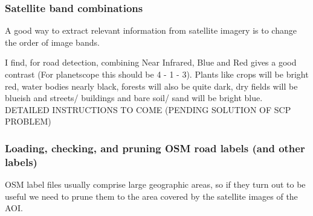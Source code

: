 \documentclass[12pt,a4paper]{scrartcl}
\begin{document}
\subsubsection{Satellite band combinations}
A good way to extract relevant information from satellite imagery is to change the order of image bands.

I find, for road detection, combining Near Infrared, Blue and Red gives a good contrast (For planetscope this should be 4 - 1 - 3).
Plants like crops will be bright red, water bodies nearly black, forests will also be quite dark, dry fields will be blueish and streets/ buildings and bare soil/ sand will be bright blue.\\

DETAILED INSTRUCTIONS TO COME (PENDING SOLUTION OF SCP PROBLEM)

\subsubsection{Loading, checking, and pruning OSM road labels (and other labels)}
OSM label files usually comprise large geographic areas, so if they turn out to be useful we need to prune them to the area covered by the satellite images of the AOI.
\end{document}
